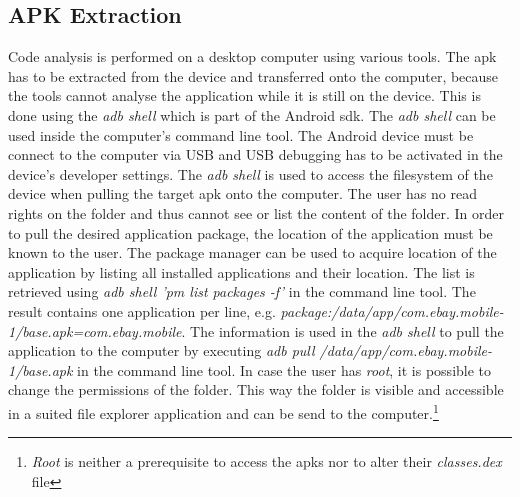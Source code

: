\subsection{APK Extraction} \label{subsection:tools-apk}
Code analysis is performed on a desktop computer using various tools.
The \gls{apk} has to be extracted from the device and transferred onto the computer, because the tools cannot analyse the application while it is still on the device.
This is done using the \textit{adb shell} which is part of the Android \gls{sdk}.
\newline
The \textit{adb shell} can be used inside the computer’s command line tool.
The Android device must be connect to the computer via USB and USB debugging has to be activated in the device’s developer settings.
The \textit{adb shell} is used to access the filesystem of the device when pulling the target \gls{apk} onto the computer.
The user has no read rights on the folder and thus cannot see or list the content of the folder.
In order to pull the desired application package, the location of the application must be known to the user.
The package manager can be used to acquire location of the application by listing all installed applications and their location.
The list is retrieved using \textit{adb shell 'pm list packages -f'} in the command line tool.
The result contains one application per line, e.g. \textit{package:/data/app/com.ebay.mobile-1/base.apk=com.ebay.mobile}.
The information is used in the \textit{adb shell} to pull the application to the computer by executing \textit{adb pull /data/app/com.ebay.mobile-1/base.apk} in the command line tool.
\newline
In case the user has \textit{root}, it is possible to change the permissions of the folder.
This way the folder is visible and accessible in a suited file explorer application and can be send to the computer.\footnote[1]{\textit{Root} is neither a prerequisite to access the \gls{apk}s nor to alter their \textit{classes.dex} file}
